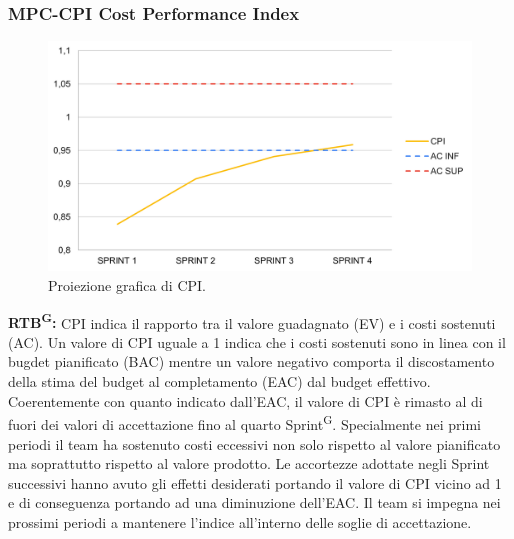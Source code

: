 \documentclass[8pt]{article}
\newcommand{\glossterm}[1]{#1\textsuperscript{G}} %
\begin{document}
\subsubsection{MPC-CPI Cost Performance Index}
\begin{figure}[h!]
    \centering
    \includegraphics[width=1\textwidth]{images/CPI.png}
    \caption{Proiezione grafica di CPI.}
    \label{fig:Proiezione grafica di CPI}
\end{figure}
\textbf{\glossterm{RTB}:} CPI indica il rapporto tra il valore guadagnato (EV) e i costi sostenuti (AC). Un valore di CPI uguale a 1 indica che i costi sostenuti sono in linea con il bugdet pianificato (BAC) mentre un valore negativo comporta il discostamento della stima del budget al completamento (EAC) dal budget effettivo.\\
Coerentemente con quanto indicato dall'EAC, il valore di CPI è rimasto al di fuori dei valori di accettazione fino al quarto \glossterm{Sprint}. Specialmente nei primi periodi il team ha sostenuto costi eccessivi non solo rispetto al valore pianificato ma soprattutto rispetto al valore prodotto. Le accortezze adottate negli Sprint successivi hanno avuto gli effetti desiderati portando il valore di CPI vicino ad 1 e di conseguenza portando ad una diminuzione dell'EAC. Il team si impegna nei prossimi periodi a mantenere l'indice all'interno delle soglie di accettazione.  
\clearpage
\end{document}
